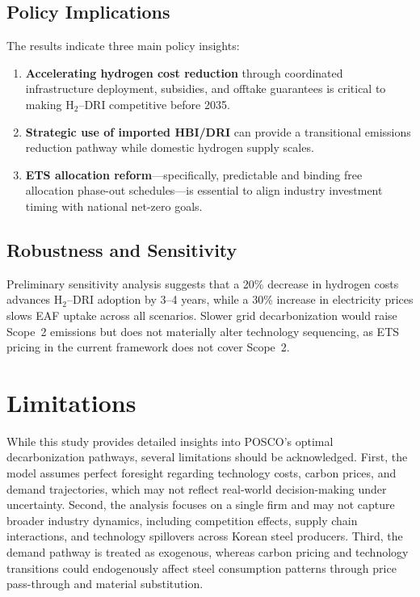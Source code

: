 \documentclass[preprint,5p,authoryear]{elsarticle}
\begin{document}
\subsection{Policy Implications}
The results indicate three main policy insights:
\begin{enumerate}
    \item \textbf{Accelerating hydrogen cost reduction} through coordinated infrastructure deployment, subsidies, and offtake guarantees is critical to making H$_2$--DRI competitive before 2035.
    \item \textbf{Strategic use of imported HBI/DRI} can provide a transitional emissions reduction pathway while domestic hydrogen supply scales.
    \item \textbf{ETS allocation reform}---specifically, predictable and binding free allocation phase-out schedules---is essential to align industry investment timing with national net-zero goals.
\end{enumerate}

\subsection{Robustness and Sensitivity}
Preliminary sensitivity analysis suggests that a 20\% decrease in hydrogen costs advances H$_2$--DRI adoption by 3--4 years, while a 30\% increase in electricity prices slows EAF uptake across all scenarios. Slower grid decarbonization would raise Scope~2 emissions but does not materially alter technology sequencing, as ETS pricing in the current framework does not cover Scope~2.

\section{Limitations}

While this study provides detailed insights into POSCO's optimal decarbonization pathways, several limitations should be acknowledged. First, the model assumes perfect foresight regarding technology costs, carbon prices, and demand trajectories, which may not reflect real-world decision-making under uncertainty. Second, the analysis focuses on a single firm and may not capture broader industry dynamics, including competition effects, supply chain interactions, and technology spillovers across Korean steel producers. Third, the demand pathway is treated as exogenous, whereas carbon pricing and technology transitions could endogenously affect steel consumption patterns through price pass-through and material substitution.
\end{document}
